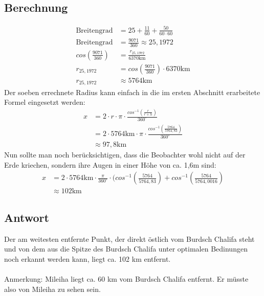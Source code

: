 \documentclass[a4paper,9pt]{scrartcl}
\begin{document}
    \subsection{Berechnung}
        \begin{align}
            \text{Breitengrad} &= 25 + \frac{11}{60} + \frac{50}{60 \cdot 60} \\
            \text{Breitengrad} &= \frac{9071}{360} \approx 25,1972 \\
            cos(\frac{9071}{360}) &= \frac{r_{25,1972}}{6370\text{km}} \\
            r_{25,1972} &= cos(\frac{9071}{360}) \cdot 6370\text{km} \\
            r_{25,1972} &\approx 5764\text{km}
        \end{align}
        Der soeben errechnete Radius kann einfach in die im ersten Abschnitt
        erarbeitete Formel eingesetzt werden:
    \begin{align}
        x &= 2 \cdot r \cdot \pi \cdot \frac{cos^{-1}(\frac{r}{r+h})}{360^\circ} \\
          &= 2 \cdot 5764 \text{km} \cdot \pi \cdot \frac{cos^{-1}(\frac{5764}{5764,83})}{360^\circ} \\
          &\approx 97,8 \text{km}
    \end{align}
        Nun sollte man noch berücksichtigen, dass die Beobachter wohl nicht auf
        der Erde kriechen, sondern ihre Augen in einer Höhe von ca. 1,6m sind:
    \begin{align}
        x &= 2 \cdot 5764 \text{km} \cdot \frac{\pi}{360^\circ} \cdot ( cos^{-1}(\frac{5764}{5764,83}) + cos^{-1}(\frac{5764}{5764,0016}) \\
          &\approx 102 \text{km}
    \end{align}

    \subsection{Antwort}
        Der am weitesten entfernte Punkt, der direkt östlich vom Burdsch Chalifa
        steht und von dem aus die Spitze des Burdsch Chalifa unter optimalen
        Bedinungen noch erkannt werden kann, liegt ca. 102 km entfernt. \\
        \\
        Anmerkung: Mileiha liegt ca. 60 km vom Burdsch Chalifa entfernt. Er
        müsste also von Mileiha zu sehen sein.
\end{document}
